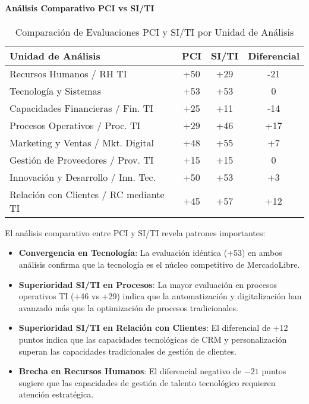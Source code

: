 \paragraph{Análisis Comparativo PCI vs SI/TI}

\begin{table}[H]
\centering
\small
\begin{tabular}{|l|c|c|c|}
\hline
\textbf{Unidad de Análisis} & \textbf{PCI} & \textbf{SI/TI} & \textbf{Diferencial} \\
\hline
Recursos Humanos / RH TI & +50 & +29 & -21 \\
\hline
Tecnología y Sistemas & +53 & +53 & 0 \\
\hline
Capacidades Financieras / Fin. TI & +25 & +11 & -14 \\
\hline
Procesos Operativos / Proc. TI & +29 & +46 & +17 \\
\hline
Marketing y Ventas / Mkt. Digital & +48 & +55 & +7 \\
\hline
Gestión de Proveedores / Prov. TI & +15 & +15 & 0 \\
\hline
Innovación y Desarrollo / Inn. Tec. & +50 & +53 & +3 \\
\hline
Relación con Clientes / RC mediante TI & +45 & +57 & +12 \\
\hline
\end{tabular}
\caption{Comparación de Evaluaciones PCI y SI/TI por Unidad de Análisis}
\label{tab:comparacion_pci_siti}
\end{table}

El análisis comparativo entre PCI y SI/TI revela patrones importantes:

\begin{itemize}
\item \textbf{Convergencia en Tecnología}: La evaluación idéntica (+53) en ambos análisis confirma que la tecnología es el núcleo competitivo de MercadoLibre.

\item \textbf{Superioridad SI/TI en Procesos}: La mayor evaluación en procesos operativos TI (+46 vs +29) indica que la automatización y digitalización han avanzado más que la optimización de procesos tradicionales.

\item \textbf{Superioridad SI/TI en Relación con Clientes}: El diferencial de +12 puntos indica que las capacidades tecnológicas de CRM y personalización superan las capacidades tradicionales de gestión de clientes.

\item \textbf{Brecha en Recursos Humanos}: El diferencial negativo de $-21$ puntos sugiere que las capacidades de gestión de talento tecnológico requieren atención estratégica.
\end{itemize}

